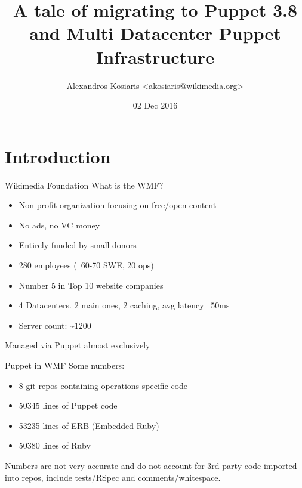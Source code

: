 \documentclass{beamer}
\title[A tale of Multi DC puppet woes]{A tale of migrating to Puppet 3.8 and Multi Datacenter Puppet Infrastructure}
\author{Alexandros Kosiaris <akosiaris@wikimedia.org>}
\institute{GRNOG - 4th Technical Meeting}
\date{02 Dec 2016}
\begin{document}

\begin{frame}
    \titlepage
\end{frame}

\section{Introduction}

    \begin{frame}{Wikimedia Foundation}
        What is the WMF?
        \begin{itemize}
        \pause \item Non-profit organization focusing on free/open content
        \pause \item No ads, no VC money
        \pause \item Entirely funded by small donors
        \pause \item 280 employees (~60-70 SWE, 20 ops)
        \pause \item Number 5 in Top 10 website companies
        \pause \item 4 Datacenters. 2 main ones, 2 caching, avg latency ~50ms
        \pause \item Server count: \textasciitilde 1200
        \end{itemize}
    \pause Managed via Puppet almost exclusively
    \end{frame}

    \begin{frame}{Puppet in WMF}
        Some numbers:
        \begin{itemize}
            \pause \item 8 git repos containing operations specific code
            \pause \item 50345 lines of Puppet code
            \pause \item 53235 lines of ERB (Embedded Ruby)
            \pause \item 50380 lines of Ruby
        \end{itemize}
        \pause Numbers are not very accurate and do not account for 3rd party code
        imported into repos, include tests/RSpec and comments/whitespace.
    \end{frame}
\end{document}
